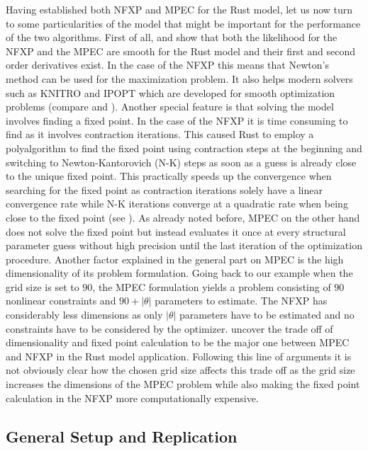 Having established both NFXP and MPEC for the Rust model, let us now turn to some particularities of the model that might be important for the performance of the two algorithms. First of all, \cite{Rust.1987} and \cite{Su.Judd.2012} show that both the likelihood for the NFXP and the MPEC are smooth for the Rust model and their first and second order derivatives exist. In the case of the NFXP this means that Newton's method can be used for the maximization problem. It also helps modern solvers such as KNITRO and IPOPT which are developed for smooth optimization problems (compare \cite{Byrd.Nocedal.Waltz.2006} and \cite{Waechter2009}). Another special feature is that solving the model involves finding a fixed point. In the case of the NFXP it is time consuming to find as it involves contraction iterations. This caused Rust to employ a polyalgorithm to find the fixed point using contraction steps at the beginning and switching to Newton-Kantorovich (N-K) steps as soon as a guess is already close to the unique fixed point. This practically speeds up the convergence when searching for the fixed point as contraction iterations solely have a linear convergence rate while N-K iterations converge at a quadratic rate when being close to the fixed point (see \cite{Rust.1987, Rust.2000}). As already noted before, MPEC on the other hand does not solve the fixed point but instead evaluates it once at every structural parameter guess without high precision until the last iteration of the optimization procedure. Another factor explained in the general part on MPEC is the high dimensionality of its problem formulation. Going back to our example when the grid size is set to $90$, the MPEC formulation yields a problem consisting of $90$ nonlinear constraints and $90 + |\theta|$ parameters to estimate. The NFXP has considerably less dimensions as only $|\theta|$ parameters have to be estimated and no constraints have to be considered by the optimizer. \cite{Su.Judd.2012} uncover the trade off of dimensionality and fixed point calculation to be the major one between MPEC and NFXP in the Rust model application. Following this line of arguments it is not obviously clear how the chosen grid size affects this trade off as the grid size increases the dimensions of the MPEC problem while also making the fixed point calculation in the NFXP more computationally expensive.

\subsection{General Setup and Replication} \label{generalsetup}

